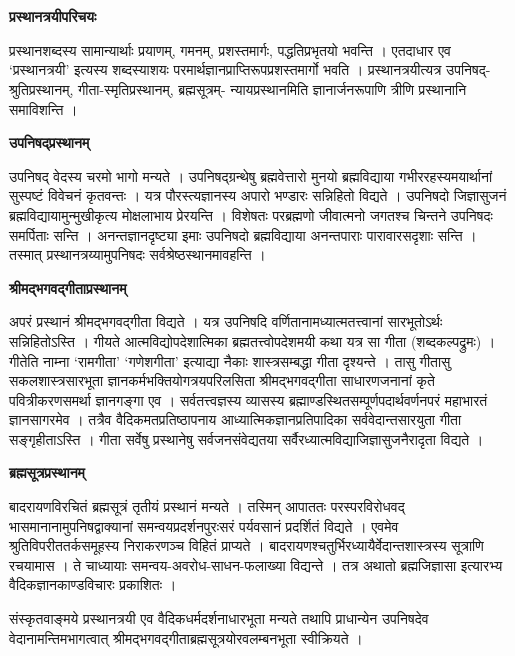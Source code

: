 \documentclass[11pt, a5paper]{article}
\begin{document}
\section{}

\textbf{प्रस्थानत्रयीपरिचयः}

प्रस्थानशब्दस्य सामान्यार्थाः प्रयाणम्, गमनम्, प्रशस्तमार्गः, पद्धतिप्रभृतयो भवन्ति । एतदाधार एव ‘प्रस्थानत्रयी’ इत्यस्य शब्दस्याशयः परमार्थज्ञानप्राप्तिरूपप्रशस्तमार्गो भवति । प्रस्थानत्रयीत्यत्र उपनिषद्-श्रुतिप्रस्थानम्, गीता-स्मृतिप्रस्थानम्, ब्रह्मसूत्रम्- न्यायप्रस्थानमिति ज्ञानार्जनरूपाणि त्रीणि प्रस्थानानि समाविशन्ति ।

\textbf{उपनिषद्प्रस्थानम्}

उपनिषद् वेदस्य चरमो भागो मन्यते । उपनिषद्‌ग्रन्थेषु ब्रह्मवेत्तारो मुनयो ब्रह्मविद्याया गभीररहस्यमयार्थानां सुस्पष्टं विवेचनं कृतवन्तः । यत्र पौरस्त्यज्ञानस्य अपारो भण्डारः सन्निहितो  विद्यते । उपनिषदो जिज्ञासुजनं ब्रह्मविद्यायामुन्मुखीकृत्य मोक्षलाभाय प्रेरयन्ति । विशेषतः परब्रह्मणो जीवात्मनो जगतश्च चिन्तने उपनिषदः समर्पिताः सन्ति । अनन्तज्ञानदृष्ट्या इमाः उपनिषदो ब्रह्मविद्याया अनन्तपाराः पारावारसदृशाः सन्ति । तस्मात् प्रस्थानत्रय्यामुपनिषदः सर्वश्रेष्ठस्थानमावहन्ति ।

\textbf{श्रीमद्भगवद्गीताप्रस्थानम्}

अपरं प्रस्थानं श्रीमद्भगवद्गीता विद्यते । यत्र उपनिषदि वर्णितानामध्यात्मतत्त्वानां सारभूतोऽर्थः सन्निहितोऽस्ति । गीयते आत्मविद्योपदेशात्मिका ब्रह्मतत्त्वोपदेशमयी कथा यत्र सा गीता (शब्दकल्पद्रुमः) । गीतेति नाम्ना ‘रामगीता’ ‘गणेशगीता’  इत्याद्या नैकाः शास्त्रसम्बद्धा गीता दृश्यन्ते । तासु गीतासु सकलशास्त्रसारभूता ज्ञानकर्मभक्तियोगत्रयपरिलसिता श्रीमद्भगवद्गीता साधारणजनानां कृते पवित्रीकरणसमर्था ज्ञानगङ्‌गा एव । सर्वतत्त्वज्ञस्य व्यासस्य ब्रह्माण्डस्थितसम्पूर्णपदार्थवर्णनपरं महाभारतं ज्ञानसागरमेव । तत्रैव वैदिकमतप्रतिष्ठापनाय आध्यात्मिकज्ञानप्रतिपादिका सर्ववेदान्तसारयुता गीता सङ्‌गृहीताऽस्ति । गीता सर्वेषु प्रस्थानेषु सर्वजनसंवेद्यतया सर्वैरध्यात्मविद्याजिज्ञासुजनैरादृता विद्यते ।

\textbf{ब्रह्मसूत्रप्रस्थानम्}

बादरायणविरचितं ब्रह्मसूत्रं तृतीयं प्रस्थानं मन्यते । तस्मिन् आपाततः परस्परविरोधवद् भासमानानामुपनिषद्वाक्यानां समन्वयप्रदर्शनपुरःसरं पर्यवसानं प्रदर्शितं विद्यते । एवमेव श्रुतिविपरीततर्कसमूहस्य निराकरणञ्च विहितं प्राप्यते । बादरायणश्चतुर्भिरध्यायैर्वेदान्तशास्त्रस्य सूत्राणि रचयामास । ते चाध्यायाः समन्वय-अवरोध-साधन-फलाख्या विद्यन्ते । तत्र अथातो ब्रह्मजिज्ञासा इत्यारभ्य वैदिकज्ञानकाण्डविचारः प्रकाशितः ।

संस्कृतवाङ्‌मये प्रस्थानत्रयी एव वैदिकधर्मदर्शनाधारभूता मन्यते तथापि प्राधान्येन उपनिषदेव वेदानामन्तिमभागत्वात्  श्रीमद्भगवद्गीताब्रह्मसूत्रयोरवलम्बनभूता स्वीक्रियते ।
\end{document}
